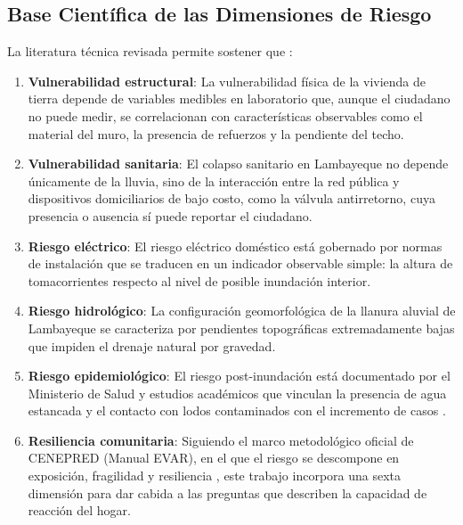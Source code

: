 \documentclass[12pt, letterpaper]{article}
\begin{document}
\subsection{Base Científica de las Dimensiones de Riesgo}

La literatura técnica revisada permite sostener que \parencite{min_vivienda_rne, typsa_drenaje, usat_drenaje, osinergmin_cne, perez_leptospira, minsa_alerta_2023, geresa_sala, cenepred_jornada}:

\begin{enumerate}
  \item \textbf{Vulnerabilidad estructural}: La vulnerabilidad física de la vivienda de tierra depende de variables medibles en laboratorio que, aunque el ciudadano no puede medir, se correlacionan con características observables como el material del muro, la presencia de refuerzos y la pendiente del techo.
  \item \textbf{Vulnerabilidad sanitaria}: El colapso sanitario en Lambayeque no depende únicamente de la lluvia, sino de la interacción entre la red pública y dispositivos domiciliarios de bajo costo, como la válvula antirretorno, cuya presencia o ausencia sí puede reportar el ciudadano.
  \item \textbf{Riesgo eléctrico}: El riesgo eléctrico doméstico está gobernado por normas de instalación que se traducen en un indicador observable simple: la altura de tomacorrientes respecto al nivel de posible inundación interior.
  \item \textbf{Riesgo hidrológico}: La configuración geomorfológica de la llanura aluvial de Lambayeque se caracteriza por pendientes topográficas extremadamente bajas que impiden el drenaje natural por gravedad.
  \item \textbf{Riesgo epidemiológico}: El riesgo post-inundación está documentado por el Ministerio de Salud y estudios académicos que vinculan la presencia de agua estancada y el contacto con lodos contaminados con el incremento de casos \parencite{minsa_alerta_2023, geresa_sala, perez_leptospira}.
  \item \textbf{Resiliencia comunitaria}: Siguiendo el marco metodológico oficial de CENEPRED (Manual EVAR), en el que el riesgo se descompone en exposición, fragilidad y resiliencia \parencite{cenepred_manual_evar}, este trabajo incorpora una sexta dimensión para dar cabida a las preguntas que describen la capacidad de reacción del hogar.
\end{enumerate}

\clearpage
\end{document}
